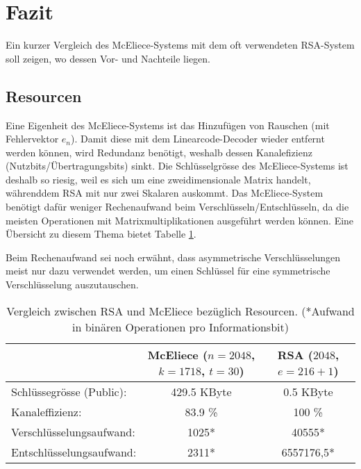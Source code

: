 %
%
%
\section{Fazit
\label{mceliece:section:fazit}}
Ein kurzer Vergleich des McEliece-Systems
mit dem oft verwendeten RSA-System soll zeigen, wo dessen Vor- und Nachteile liegen.

\subsection{Resourcen}
Eine Eigenheit des McEliece-Systems ist das Hinzufügen von Rauschen (mit Fehlervektor $e_n$).
Damit diese mit dem Linearcode-Decoder wieder entfernt werden können,
wird Redundanz benötigt,
weshalb dessen Kanalefizienz (Nutzbits/Übertragungsbits) sinkt.
Die Schlüsselgrösse des McEliece-Systems ist deshalb so riesig, weil es sich um eine zweidimensionale Matrix handelt, währenddem RSA mit nur zwei Skalaren auskommt.
Das McEliece-System benötigt dafür weniger Rechenaufwand beim Verschlüsseln/Entschlüsseln,
da die meisten Operationen mit Matrixmultiplikationen ausgeführt werden können.
Eine Übersicht zu diesem Thema bietet Tabelle \ref{mceliece:tab:comparison_effort}.

Beim Rechenaufwand sei noch erwähnt,
dass asymmetrische Verschlüsselungen meist nur dazu verwendet werden,
um einen Schlüssel für eine symmetrische Verschlüsselung auszutauschen.
\begin{table}
    \begin{center}
        \begin{tabular}{l|c|c}
                                        &McEliece ($n=2048$, $k=1718$, $t = 30$)  &RSA ($2048$, $e = 216 + 1$)\\
            \hline
            Schlüssegrösse (Public):    &429.5 KByte                        &0.5 KByte              \\
            Kanaleffizienz:             &83.9 \%                            &100 \%                 \\
            Verschlüsselungsaufwand:    &1025*                               &40555*                  \\
            Entschlüsselungsaufwand:    &2311*                               &6557176,5*             \\
        \end{tabular}
    \end{center}
    \caption{\label{mceliece:tab:comparison_effort}Vergleich zwischen RSA und McEliece bezüglich Resourcen\cite{mceliece:CodeBasedCrypto}. (*Aufwand in binären Operationen pro Informationsbit)}
\end{table}

